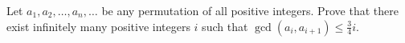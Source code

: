 

\begin{problem}
	Let $a_1,a_2,\ldots,a_n,\ldots$ be any permutation of all positive integers. Prove that there exist infinitely many positive integers $i$ such that $\gcd(a_i,a_{i+1})\leq \frac{3}{4} i$. %
\end{problem}

